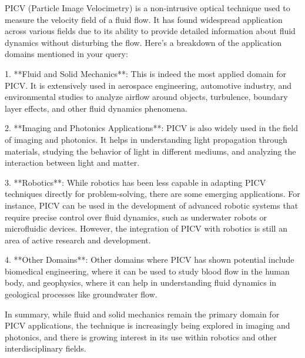 PICV (Particle Image Velocimetry) is a non-intrusive optical technique used to measure the velocity field of a fluid flow. It has found widespread application across various fields due to its ability to provide detailed information about fluid dynamics without disturbing the flow. Here's a breakdown of the application domains mentioned in your query:

1. **Fluid and Solid Mechanics**: This is indeed the most applied domain for PICV. It is extensively used in aerospace engineering, automotive industry, and environmental studies to analyze airflow around objects, turbulence, boundary layer effects, and other fluid dynamics phenomena.

2. **Imaging and Photonics Applications**: PICV is also widely used in the field of imaging and photonics. It helps in understanding light propagation through materials, studying the behavior of light in different mediums, and analyzing the interaction between light and matter.

3. **Robotics**: While robotics has been less capable in adapting PICV techniques directly for problem-solving, there are some emerging applications. For instance, PICV can be used in the development of advanced robotic systems that require precise control over fluid dynamics, such as underwater robots or microfluidic devices. However, the integration of PICV with robotics is still an area of active research and development.

4. **Other Domains**: Other domains where PICV has shown potential include biomedical engineering, where it can be used to study blood flow in the human body, and geophysics, where it can help in understanding fluid dynamics in geological processes like groundwater flow.

In summary, while fluid and solid mechanics remain the primary domain for PICV applications, the technique is increasingly being explored in imaging and photonics, and there is growing interest in its use within robotics and other interdisciplinary fields.